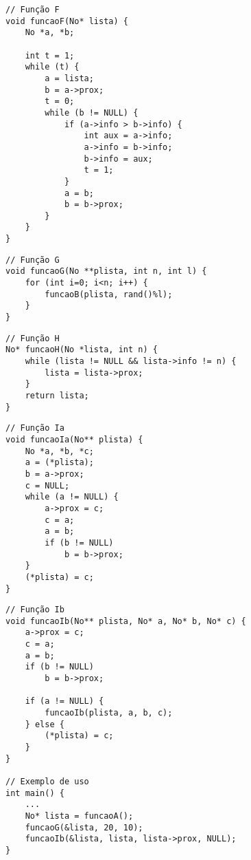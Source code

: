 \documentclass[a4paper]{article}
\begin{document}
\begin{tcolorbox}
    \begin{verbatim}
// Função F
void funcaoF(No* lista) {
    No *a, *b;

    int t = 1;
    while (t) {
        a = lista;
        b = a->prox;
        t = 0;
        while (b != NULL) {
            if (a->info > b->info) {
                int aux = a->info;
                a->info = b->info;
                b->info = aux;
                t = 1;
            }
            a = b;
            b = b->prox;
        }
    }
}
    \end{verbatim}
\end{tcolorbox}

\begin{tcolorbox}
    \begin{verbatim}
// Função G
void funcaoG(No **plista, int n, int l) {
    for (int i=0; i<n; i++) {
        funcaoB(plista, rand()%l);
    }
}
    \end{verbatim}
\end{tcolorbox}

\begin{tcolorbox}
    \begin{verbatim}
// Função H
No* funcaoH(No *lista, int n) {
    while (lista != NULL && lista->info != n) {
        lista = lista->prox;
    }
    return lista;
}
    \end{verbatim}
\end{tcolorbox}


\begin{tcolorbox}
    \begin{verbatim}
// Função Ia
void funcaoIa(No** plista) {
    No *a, *b, *c;
    a = (*plista);
    b = a->prox;
    c = NULL;
    while (a != NULL) {
        a->prox = c;
        c = a;
        a = b;
        if (b != NULL)
            b = b->prox;
    }
    (*plista) = c;
}
    \end{verbatim}
\end{tcolorbox}


\begin{tcolorbox}
    \begin{verbatim}
// Função Ib
void funcaoIb(No** plista, No* a, No* b, No* c) {
    a->prox = c;
    c = a;
    a = b;
    if (b != NULL)
        b = b->prox;

    if (a != NULL) {
        funcaoIb(plista, a, b, c);
    } else {
        (*plista) = c;
    }
}

// Exemplo de uso
int main() {
    ...
    No* lista = funcaoA();
    funcaoG(&lista, 20, 10);
    funcaoIb(&lista, lista, lista->prox, NULL);
}
    \end{verbatim}
\end{tcolorbox}
\end{document}
